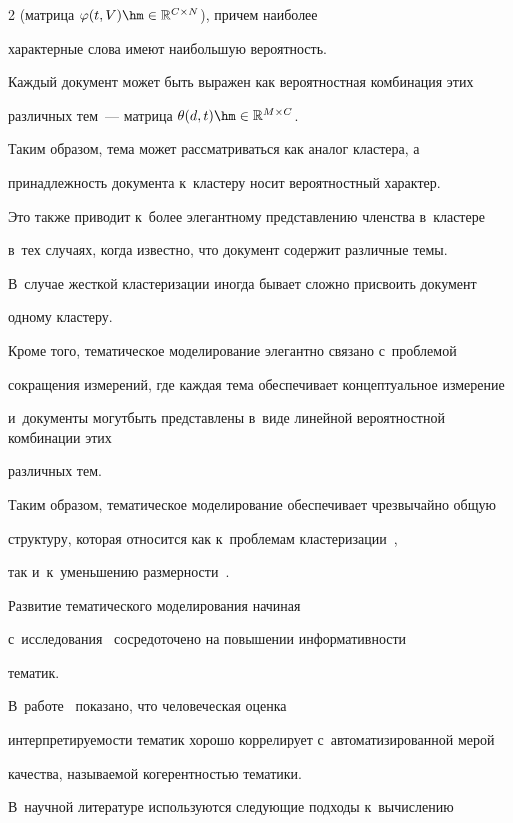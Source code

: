 \begin{multicols}{2}
(матрица $\varphi(t,V) \hm\in \mathbb{R}^{C \times N}$), причем наиболее 


характерные слова имеют наибольшую вероятность.


    Каждый документ может быть выражен как вероятностная комбинация этих 


различных тем~--- матрица $\theta (d,t) \hm\in \mathbb{R}^{M \times C} $.


    Таким образом, тема может рассматриваться как аналог кластера, а 


принадлежность документа к~кластеру носит вероятностный характер.


    Это также приводит к~более элегантному представлению членства в~кластере 


    в~тех случаях, когда известно, что документ содержит различные темы.


    В~случае жесткой кластеризации иногда бывает сложно присвоить документ 


одному кластеру.


    Кроме того, тематическое моделирование элегантно связано с~проб\-ле\-мой 


сокращения измерений, где каждая тема обеспечивает концептуальное измерение 


и~документы могут\linebreak быть представлены в~виде линейной вероятностной комбинации этих 


различных тем.


    Таким образом, тематическое моделирование обеспечивает чрезвычайно общую 


структуру, которая относится как к~проблемам кластеризации~\cite{kumar2017lda}, 


так и~к~уменьшению размерности~\cite{onan2017improved}.


    


    Развитие тематического моделирования начиная 


    с~исследования~\cite{hofmann1999probabilistic} сосредоточено на повышении информативности 


тематик.


    В~работе~\cite{roder2015exploring} показано, что человеческая оценка 


интерпретируемости тематик хорошо коррелирует с~автоматизированной мерой 


качества, называемой ко\-ге\-рент\-ностью тематики. 


    В~научной литературе используются следующие подходы к~вычислению 



\end{multicols}
